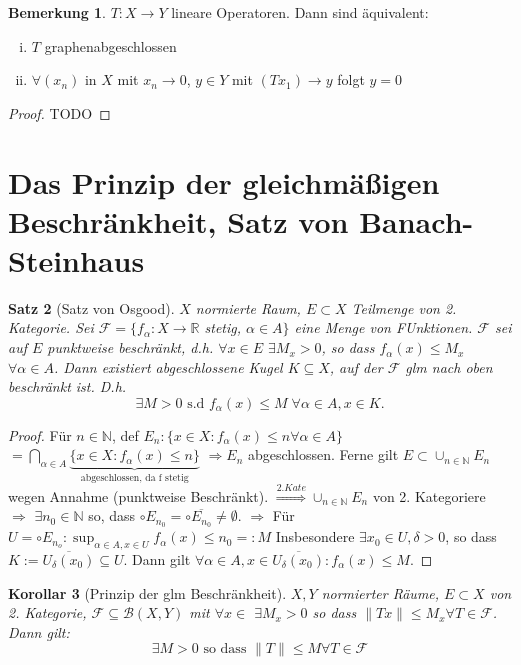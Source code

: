 \documentclass[ngerman]{report}
\theoremstyle{plain}%
\newtheorem{thm}{Satz}[chapter]
\newtheorem{cor}[thm]{Korollar}
\theoremstyle{definition}%
\theoremstyle{myStyle}
\newtheorem{bem}[thm]{Bemerkung}
\newcommand{\R}{\mathbb{R}}
\newcommand{\N}{\mathbb{N}}
\newcommand{\BS}[1][X,Y]{\mathcal{B}(#1)} %
\newcommand{\norm}[1]{\|#1\|}
\newcommand{\df}[1][]{%
	\overset{#1}{\Rightarrow}
}
\begin{document}
	\begin{bem}
		$T: X\to Y$ lineare Operatoren. Dann sind äquivalent:
			\begin{enumerate}[(i)]
				\item $T$ graphenabgeschlossen 
				\item $\forall (x_n)$ in $X$ mit $x_n \to 0$, $y\in Y$ mit $ (Tx_1) \to y$ folgt $y=0$ 
			\end{enumerate}

		\begin{proof}
				TODO
		\end{proof}

	\end{bem}

	\section{Das Prinzip der gleichmäßigen Beschränkheit, Satz von Banach-Steinhaus}
\newcommand{\F}{\mathcal{F}}
	\begin{thm}[Satz von Osgood]
		$X$ normierte Raum, $E \subset X$ Teilmenge von 2. Kategorie.	Sei $\mathcal{F} = \{f_\alpha: X\to \R$ stetig, $\alpha \in A\}$ eine Menge von FUnktionen. $\F$ sei auf $E$ punktweise beschränkt, d.h. $\forall x\in E$ $\exists M_x > 0$, so dass $f_\alpha (x) \leq M_x$ $\forall \alpha \in A$. Dann existiert abgeschlossene Kugel $K\subseteq X$, auf der $\F$ glm nach oben beschränkt ist. D.h.
		$$\exists M > 0 \text{ s.d } f_\alpha (x) \leq M \; \forall \alpha \in A, x\in K.$$
	\end{thm}
	
	\begin{proof}
		Für $n\in \N$, def $E_n : \{x\in X: f_\alpha(x) \leq n \forall \alpha \in A\}$
		$= \bigcap_{\alpha\in A} \underbrace{\{ x\in X: f_\alpha (x) \leq n\}}_{\text{abgeschlossen, da f stetig}}$
		$\df E_n$ abgeschlossen. Ferne gilt $E\subset \cup_{n\in\N} E_n$ wegen Annahme (punktweise Beschränkt). $\df[2. Kate] \cup_{n\in\N} E_n$ von 2. Kategoriere 
		$\df$ $\exists n_0 \in \N$ so, dass $\circ E_{n_0} = \circ \overline{E_{n_0}} \neq \emptyset.$
		$\df$ Für $U = \circ E_{n_o} :\sup_{\alpha \in A, x \in U} f_\alpha (x) \leq n_0 =: M$
		Insbesondere $\exists x_0 \in U, \delta > 0$, so dass $K:= \overline{U_\delta(x_0)} \subseteq U$. Dann gilt $\forall \alpha \in A, x\in \overline{U_\delta(x_0)}: f_\alpha (x) \leq M.$
	\end{proof}

	\begin{cor}[Prinzip der glm Beschränkheit]
		$X,Y$ normierter Räume, $E\subset X$ von 2. Kategorie, 
			$\F \subseteq \BS$ mit $\forall x \in $ $\exists M_x > 0$ so dass $\norm{Tx} \leq M_x \forall T \in \F$.
			Dann gilt: $$\exists M > 0 \text{ so dass } \norm{T} \leq M \forall T \in \F$$
	\end{cor}
\end{document}

